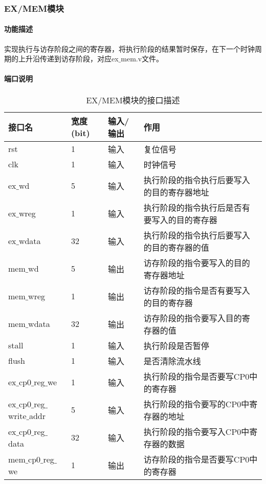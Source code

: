 \subsubsection{EX/MEM模块}
\paragraph{功能描述}
\quad

\quad

实现执行与访存阶段之间的寄存器，将执行阶段的结果暂时保存，在下一个时钟周期的上升沿传递到访存阶段，对应ex$\_$mem.v文件。
\paragraph{端口说明}
\quad

\quad
\begin{table}[H]
	\centering
	\caption{EX/MEM模块的接口描述}
	\begin{tabular}{|l|l|l|l|}
		\hline
		接口名 & 宽度(bit) & 输入/输出 & 作用 \\
		\hline
		rst & 1 & 输入 & 复位信号 \\
		\hline
		clk & 1 & 输入 & 时钟信号 \\
		\hline
		ex$\_$wd & 5 & 输入 & 执行阶段的指令执行后要写入的目的寄存器地址 \\
		\hline
		ex$\_$wreg & 1 & 输入 & 执行阶段的指令执行后是否有要写入的目的寄存器 \\
		\hline
		ex$\_$wdata & 32 & 输入 & 执行阶段的指令执行后要写入的目的寄存器的值 \\
		\hline
		mem$\_$wd & 5 & 输出 & 访存阶段的指令要写入的目的寄存器地址 \\
		\hline
		mem$\_$wreg & 1 & 输出 & 访存阶段的指令是否有要写入的目的寄存器 \\
		\hline
		mem$\_$wdata & 32 & 输出 & 访存阶段的指令要写入目的寄存器的值 \\
		\hline
		stall & 1 & 输入 & 执行阶段是否暂停 \\
		\hline
		flush & 1 & 输入 & 是否清除流水线 \\
		\hline
		ex$\_$cp0$\_$reg$\_$we & 1 & 输入 & 执行阶段的指令是否要写CP0中的寄存器 \\
		\hline
		ex$\_$cp0$\_$reg$\_$write$\_$addr & 5 & 输入 & 执行阶段的指令要写的CP0中寄存器的地址 \\
		\hline
		ex$\_$cp0$\_$reg$\_$data & 32 & 输入 & 执行阶段的指令要写入CP0中寄存器的数据 \\
		\hline
		mem$\_$cp0$\_$reg$\_$we & 1 & 输出 & 访存阶段的指令是否要写CP0中的寄存器 \\

\end{tabular}
\end{table}
